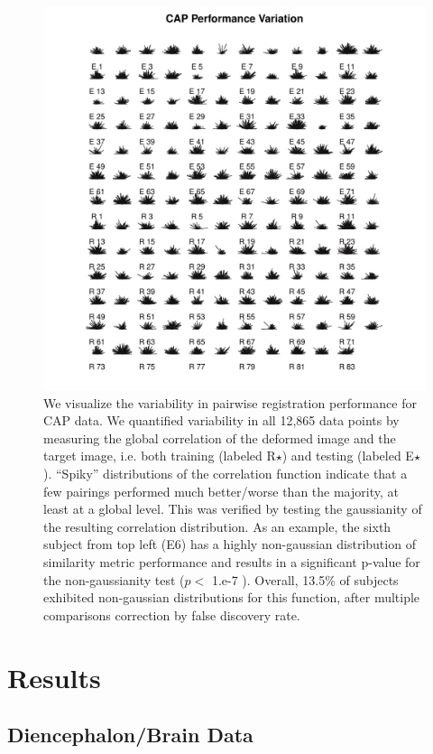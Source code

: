 \documentclass{llncs}
\begin{document}
\begin{figure}[t]
 \centering 
  \includegraphics[width=5in]{../figs/spider_CAP.pdf}
 \caption{We visualize the variability in pairwise registration
   performance for CAP data.  We quantified variability in
   all 12,865 data points by measuring
   the global correlation of the deformed image and the target image,
   i.e. both training (labeled R$\star$) and testing (labeled E$\star$). ``Spiky''
   distributions of the correlation function indicate that
 a few pairings performed much better/worse than the majority, at
 least at a global level.  This
 was verified by testing the gaussianity of the resulting correlation
 distribution.  As an example, the sixth subject from top left (E6) has a
 highly non-gaussian distribution of similarity metric performance and
results in a significant p-value for the non-gaussianity test ($p <$
1.e-7 ).  Overall, 13.5\% of subjects exhibited non-gaussian
distributions for this function, after multiple comparisons correction by false discovery rate.}
 \label{fig:CAPvar}
\end{figure}

\section{Results}

\subsection{Diencephalon/Brain Data}
\end{document}
